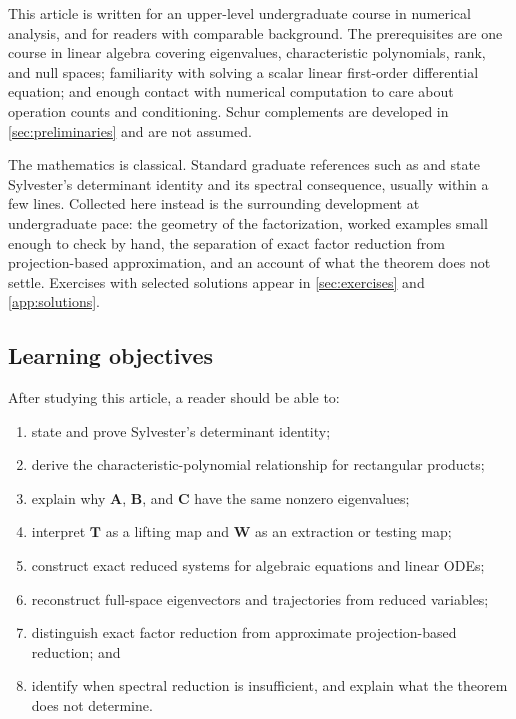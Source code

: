 \documentclass[11pt]{article}
\newcommand{\mat}[1]{\mathbf{#1}}
\theoremstyle{definition}
\theoremstyle{remark}
\begin{document}
This article is written for an upper-level undergraduate course in numerical analysis, and for readers with comparable background. The prerequisites are one course in linear algebra covering eigenvalues, characteristic polynomials, rank, and null spaces; familiarity with solving a scalar linear first-order differential equation; and enough contact with numerical computation to care about operation counts and conditioning. Schur complements are developed in \cref{sec:preliminaries} and are not assumed.

The mathematics is classical. Standard graduate references such as \textcite{horn2013matrix} and \textcite{golub2013matrix} state Sylvester's determinant identity and its spectral consequence, usually within a few lines. Collected here instead is the surrounding development at undergraduate pace: the geometry of the factorization, worked examples small enough to check by hand, the separation of exact factor reduction from projection-based approximation, and an account of what the theorem does not settle. Exercises with selected solutions appear in \cref{sec:exercises} and \cref{app:solutions}.

\subsection*{Learning objectives}

After studying this article, a reader should be able to:
\begin{enumerate}[label=\arabic*.]
  \item state and prove Sylvester's determinant identity;
  \item derive the characteristic-polynomial relationship for rectangular products;
  \item explain why \(\mat{A}\), \(\mat{B}\), and \(\mat{C}\) have the same nonzero eigenvalues;
  \item interpret \(\mat{T}\) as a lifting map and \(\mat{W}\) as an extraction or testing map;
  \item construct exact reduced systems for algebraic equations and linear ODEs;
  \item reconstruct full-space eigenvectors and trajectories from reduced variables;
  \item distinguish exact factor reduction from approximate projection-based reduction; and
  \item identify when spectral reduction is insufficient, and explain what the theorem does not determine.
\end{enumerate}
\end{document}
